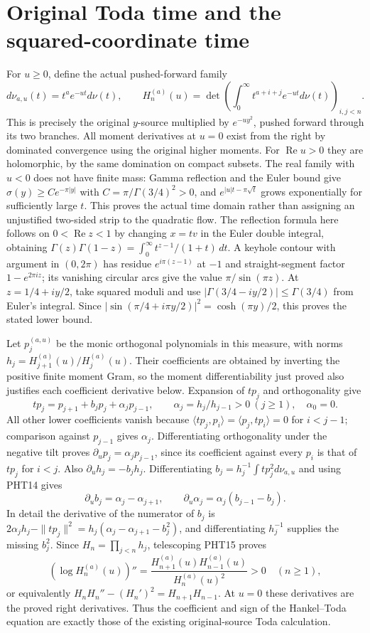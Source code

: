 \section{Original Toda time and the squared-coordinate time}

For $u\geq0$, define the actual pushed-forward family
\[
 d\nu_{a,u}(t)=t^a e^{-ut}d\nu(t),\qquad
 H_n^{(a)}(u)=\det\left(\int_0^\infty
                    t^{a+i+j}e^{-ut}d\nu(t)\right)_{i,j<n}.
\tag{PHT13}
\]
This is precisely the original $y$-source multiplied by
$e^{-u y^2}$, pushed forward through its two branches.
All moment derivatives at $u=0$ exist from the right by
dominated convergence using the original higher moments.
For $\operatorname{Re}u>0$ they are holomorphic, by the same
domination on compact subsets. The real family with $u<0$
does not have finite mass: Gamma reflection and the Euler
bound give $\sigma(y)\geq C e^{-\pi|y|}$ with
$C=\pi/\Gamma(3/4)^2>0$, and
$e^{|u|t-\pi\sqrt t}$ grows exponentially for sufficiently
large $t$. This proves the actual time domain rather than
assigning an unjustified two-sided strip to the quadratic flow.
The reflection formula here follows on $0<\operatorname{Re}z<1$
by changing $x=tv$ in the Euler double integral, obtaining
$\Gamma(z)\Gamma(1-z)=\int_0^\infty t^{z-1}/(1+t)\,dt$.
A keyhole contour with argument in $(0,2\pi)$ has residue
$e^{i\pi(z-1)}$ at $-1$ and straight-segment factor
$1-e^{2\pi iz}$; its vanishing circular arcs give the value
$\pi/\sin(\pi z)$. At $z=1/4+iy/2$, take squared moduli
and use $|\Gamma(3/4-iy/2)|\leq\Gamma(3/4)$ from Euler's
integral. Since $|\sin(\pi/4+i\pi y/2)|^2
=\cosh(\pi y)/2$, this proves the stated lower bound.

Let $p_j^{(a,u)}$ be the monic orthogonal polynomials in this
measure, with norms $h_j=H_{j+1}^{(a)}(u)/H_j^{(a)}(u)$.
Their coefficients are obtained by inverting the positive
finite moment Gram, so the moment differentiability just
proved also justifies each coefficient derivative below.
Expansion of $tp_j$ and orthogonality give
\[
 tp_j=p_{j+1}+b_jp_j+\alpha_jp_{j-1},\qquad
 \alpha_j=h_j/h_{j-1}>0\ (j\geq1),\quad\alpha_0=0.
\tag{PHT14}
\]
All other lower coefficients vanish because
$\langle tp_j,p_i\rangle=\langle p_j,tp_i\rangle=0$
for $i<j-1$; comparison against $p_{j-1}$ gives $\alpha_j$.
Differentiating orthogonality under the negative tilt proves
$\partial_u p_j=\alpha_jp_{j-1}$, since its coefficient
against every $p_i$ is that of $tp_j$ for $i<j$.
Also $\partial_u h_j=-b_jh_j$. Differentiating
$b_j=h_j^{-1}\int t p_j^2d\nu_{a,u}$ and using PHT14 gives
\[
 \partial_u b_j=\alpha_j-\alpha_{j+1},\qquad
 \partial_u\alpha_j=\alpha_j(b_{j-1}-b_j).
\tag{PHT15}
\]
In detail the derivative of the numerator of $b_j$ is
$2\alpha_jh_j-\|tp_j\|^2
=h_j(\alpha_j-\alpha_{j+1}-b_j^2)$, and differentiating
$h_j^{-1}$ supplies the missing $b_j^2$.
Since $H_n=\prod_{j<n}h_j$, telescoping PHT15 proves
\[
 (\log H_n^{(a)}(u))''
  =\frac{H_{n+1}^{(a)}(u)H_{n-1}^{(a)}(u)}{H_n^{(a)}(u)^2}>0
  \quad(n\geq1),
\tag{PHT16}
\]
or equivalently
$H_nH_n''-(H_n')^2=H_{n+1}H_{n-1}$.
At $u=0$ these derivatives are the proved right derivatives.
Thus the coefficient and sign of the Hankel--Toda equation
are exactly those of the existing original-source Toda calculation.

